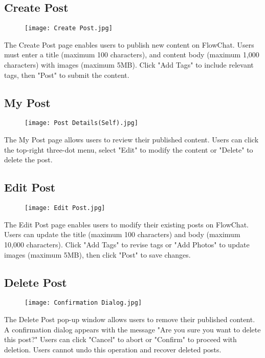\documentclass[11pt, a4paper]{article}
\begin{document}
\subsection{Create Post}
\begin{figure}[H]
    \centering
    \texttt{[image: Create Post.jpg]}
    \label{fig:Create_Post_Page}
\end{figure}
The Create Post page enables users to publish new content on FlowChat. Users must enter a title (maximum 100 characters), and content body (maximum 1,000 characters) with images (maximum 5MB). Click "Add Tags" to include relevant tags, then "Post" to submit the content.

\subsection{My Post}
\begin{figure}[H]
    \centering
    \texttt{[image: Post Details(Self).jpg]}
    \label{fig:View_Your_Own_Post_Page}
\end{figure}
The My Post page allows users to review their published content. Users can click the top-right three-dot menu, select "Edit" to modify the content or "Delete" to delete the post.

\subsection{Edit Post}
\begin{figure}[H]
    \centering
    \texttt{[image: Edit Post.jpg]}
    \label{fig:Edit_Post_Page}
\end{figure}
The Edit Post page enables users to modify their existing posts on FlowChat. Users can update the title (maximum 100 characters) and body (maximum 10,000 characters). Click "Add Tags" to revise tags or "Add Photos" to update images (maximum 5MB), then click "Post" to save changes.

\subsection{Delete Post}
\begin{figure}[H]
    \centering
    \texttt{[image: Confirmation Dialog.jpg]}
    \label{fig:Delete_Post_Page}
\end{figure}
The Delete Post pop-up window allows users to remove their published content. A confirmation dialog appears with the message "Are you sure you want to delete this post?" Users can click "Cancel" to abort or "Confirm" to proceed with deletion. Users cannot undo this operation and recover deleted posts.
\end{document}
